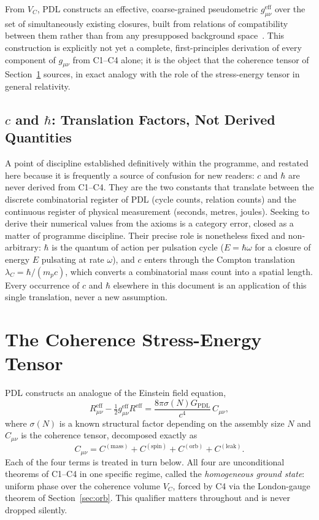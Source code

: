 \documentclass[11pt,a4paper]{article}
\newcommand{\VC}{V_C}
\newcommand{\lamC}{\lambda_C}
\newcommand{\Ccoh}{C_{\mu\nu}}
\newcommand{\Cmass}{C^{(\mathrm{mass})}}
\newcommand{\Cspin}{C^{(\mathrm{spin})}}
\newcommand{\Corb}{C^{(\mathrm{orb})}}
\newcommand{\Cleak}{C^{(\mathrm{leak})}}
\newcommand{\GPDL}{G_{\mathrm{PDL}}}
\newcommand{\geff}{g_{\mu\nu}^{\mathrm{eff}}}
\begin{document}
From $\VC$, PDL constructs an effective, coarse-grained pseudometric $\geff$ over the set of simultaneously existing closures, built from relations of compatibility between them rather than from any presupposed background space~\citep{D10a}. This construction is explicitly not yet a complete, first-principles derivation of every component of $g_{\mu\nu}$ from C1--C4 alone; it is the object that the coherence tensor of Section~\ref{sec:tensor} sources, in exact analogy with the role of the stress-energy tensor in general relativity.

\subsection{\texorpdfstring{$c$ and $\hbar$: Translation Factors, Not Derived Quantities}{c and hbar: Translation Factors, Not Derived Quantities}}
\label{sec:ch}

A point of discipline established definitively within the programme, and restated here because it is frequently a source of confusion for new readers: $c$ and $\hbar$ are never derived from C1--C4. They are the two constants that translate between the discrete combinatorial register of PDL (cycle counts, relation counts) and the continuous register of physical measurement (seconds, metres, joules). Seeking to derive their numerical values from the axioms is a category error, closed as a matter of programme discipline. Their precise role is nonetheless fixed and non-arbitrary: $\hbar$ is the quantum of action per pulsation cycle ($E=\hbar\omega$ for a closure of energy $E$ pulsating at rate $\omega$), and $c$ enters through the Compton translation $\lamC=\hbar/(m_p c)$, which converts a combinatorial mass count into a spatial length. Every occurrence of $c$ and $\hbar$ elsewhere in this document is an application of this single translation, never a new assumption.

\section{The Coherence Stress-Energy Tensor}
\label{sec:tensor}

PDL constructs an analogue of the Einstein field equation,
\begin{equation}
R_{\mu\nu}^{\mathrm{eff}} - \tfrac{1}{2}\geff R^{\mathrm{eff}} = \frac{8\pi\sigma(N)\GPDL}{c^4}\,\Ccoh,
\label{eq:einstein}
\end{equation}
where $\sigma(N)$ is a known structural factor depending on the assembly size $N$ and $\Ccoh$ is the coherence tensor, decomposed exactly as
\begin{equation}
\Ccoh = \Cmass + \Cspin + \Corb + \Cleak.
\label{eq:decomposition}
\end{equation}
Each of the four terms is treated in turn below. All four are unconditional theorems of C1--C4 in one specific regime, called the \emph{homogeneous ground state}: uniform phase over the coherence volume $\VC$, forced by C4 via the London-gauge theorem of Section~\ref{sec:orb}. This qualifier matters throughout and is never dropped silently.
\end{document}
